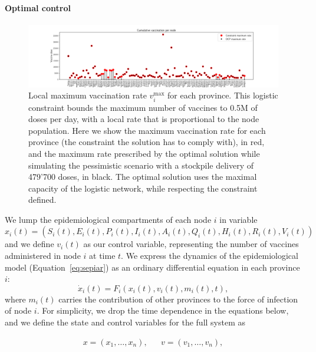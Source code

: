 \paragraph{Optimal control}
\begin{figure}[!ht]
    \centering
    \includegraphics[width=1\textwidth]{fig_italy-ocp/figuresSI/SI_constraint_dist.pdf}
    \caption[Local maximum vaccination rate for each province]{Local maximum vaccination rate $v_i^\mathrm{max}$ for each province. This logistic constraint bounds the maximum number of vaccines to 0.5M of doses per day, with a local rate that is proportional to the node population. Here we show the maximum vaccination rate for each province (the constraint the solution has to comply with), in red, and the maximum rate prescribed by the optimal solution while simulating the pessimistic scenario with a stockpile delivery of 479'700 doses, in black. The optimal solution uses the maximal capacity of the logistic network, while respecting the constraint defined.}
    \label{fig:OC_logistic_constraints}
\end{figure}

We lump the epidemiological compartments of each node $i$ in variable $x_i(t)=(S_i(t),E_i(t),P_i(t),I_i(t),A_i(t),Q_i(t),H_i(t),R_i(t),V_i(t))$ and we define $v_i(t)$ as our control variable, representing the number of vaccines administered in node $i$ at time $t$. We express the dynamics of the epidemiological model (Equation~\eqref{eq:sepiar}) as an ordinary differential equation in each province $i$:
\begin{equation}
    \label{eq:sepiar_compact}
    \dot x_i(t) = F_i(x_i(t),v_i(t), m_i(t), t),
\end{equation}
where $m_i(t)$ carries the contribution of other provinces to the force of infection of node $i$. For simplicity, we drop the time dependence in the equations below, and we define the state and control variables for the full system as

\begin{align*}
    x = (x_1,\ldots,x_n), && v = (v_1,\ldots,v_n),
\end{align*}

